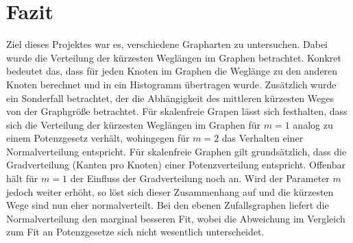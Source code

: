 \documentclass[10pt]{article}
\begin{document}
\section{Fazit}
Ziel dieses Projektes war es, verschiedene Grapharten zu untersuchen. Dabei wurde die Verteilung der kürzesten Weglängen im Graphen betrachtet. Konkret bedeutet das, dass für jeden Knoten im Graphen die Weglänge zu den anderen Knoten berechnet und in ein Histogramm übertragen wurde.
Zusätzlich wurde ein Sonderfall betrachtet, der die Abhängigkeit des mittleren kürzesten Weges von der Graphgröße betrachtet. Für skalenfreie Grapen lässt sich festhalten, dass sich die Verteilung der kürzesten Weglängen im Graphen für $m=1$ analog zu einem Potenzgesetz verhält, wohingegen für $m=2$ das Verhalten einer Normalverteilung entspricht. Für skalenfreie Graphen gilt grundsätzlich, dass die Gradverteilung (Kanten pro Knoten) einer Potenzverteilung entspricht. Offenbar hält für $m=1$ der Einfluss der Gradverteilung noch an. Wird der Parameter $m$ jedoch weiter erhöht, so löst sich dieser Zusammenhang auf und die kürzesten Wege sind nun eher normalverteilt. 
Bei den ebenen Zufallsgraphen liefert die Normalverteilung den marginal besseren Fit, wobei die Abweichung im Vergleich zum Fit an Potenzgesetze sich nicht wesentlich unterscheidet.

\newpage

 

\end{document}
